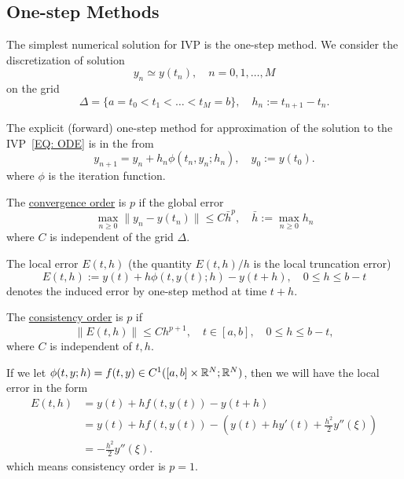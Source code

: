 \subsection{One-step Methods}
The simplest numerical solution for IVP is the one-step method. We consider the discretization of solution 
$$y_n\simeq y(t_n), \quad n = 0,1,\dots, M$$
on the grid 
$$\Delta = \{ a=  t_0 < t_1 < \dots < t_M  = b\},\quad h_n := t_{n+1} - t_n.$$
\begin{definition}[scheme]
    The explicit (forward) one-step method for approximation of the solution to the IVP~\eqref{EQ: ODE} is in the from
    \begin{equation}
        y_{n+1} = y_n + h_n \phi(t_n, y_n; h_n),\quad y_0:= y(t_0).
    \end{equation}
where $\phi$ is the iteration function.
\end{definition}
\begin{definition}[convergence]
    The \underline{convergence order} is $p$ if the global error 
    \begin{equation}
        \max_{n\ge 0}\|y_n - y(t_n)\| \le C \bar{h}^p,\quad \bar{h}:=\max_{n\ge 0}  h_n
    \end{equation} 
    where $C$ is independent of the grid $\Delta$.
\end{definition}
\begin{definition}
The local error $E(t, h)$ (the quantity $E(t, h)/h$ is the local truncation error)
\begin{equation}
    E(t, h) := y(t) + h \phi(t, y(t); h) - y(t + h),\quad 0\le h\le b - t
\end{equation}
denotes the induced error by one-step method at time $t+ h$.
\end{definition}
\begin{definition}[consistency]
    The \underline{consistency order} is $p$ if 
    \begin{equation}
        \|E(t, h)\|\le C h^{p+1},\quad t\in[a, b],\quad 0\le h \le b - t,
    \end{equation}
    where $C$ is independent of $t, h$.
\end{definition}
\begin{example}
    If we let $\phi(t, y; h) = f(t, y)\in C^1([a, b]\times \mathbb R^N; \mathbb R^N)$, then we will have the local error in the form 
    \begin{equation}
        \begin{aligned}
            E(t, h) &= y(t) + h f(t, y(t)) - y(t + h) \\    
            &= y(t) + h f(t, y(t)) - (y(t) + h y'(t) + \frac{h^2}{2} y''(\xi)) \\
            & = -\frac{h^2}{2} y''(\xi).
        \end{aligned} 
    \end{equation}
    which means consistency order is $p = 1$.
\end{example}
